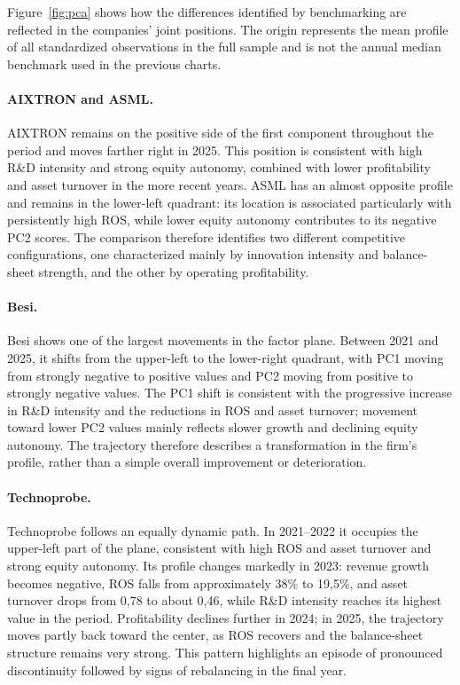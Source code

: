 \documentclass[11pt,a4paper]{article}
\begin{document}
Figure~\ref{fig:pca} shows how the differences identified by benchmarking are reflected in the companies' joint positions. The origin represents the mean profile of all standardized observations in the full sample and is not the annual median benchmark used in the previous charts.

\paragraph{AIXTRON and ASML.}
AIXTRON remains on the positive side of the first component throughout the period and moves farther right in 2025. This position is consistent with high R\&D intensity and strong equity autonomy, combined with lower profitability and asset turnover in the more recent years. ASML has an almost opposite profile and remains in the lower-left quadrant: its location is associated particularly with persistently high ROS, while lower equity autonomy contributes to its negative PC2 scores. The comparison therefore identifies two different competitive configurations, one characterized mainly by innovation intensity and balance-sheet strength, and the other by operating profitability.

\paragraph{Besi.}
Besi shows one of the largest movements in the factor plane. Between 2021 and 2025, it shifts from the upper-left to the lower-right quadrant, with PC1 moving from strongly negative to positive values and PC2 moving from positive to strongly negative values. The PC1 shift is consistent with the progressive increase in R\&D intensity and the reductions in ROS and asset turnover; movement toward lower PC2 values mainly reflects slower growth and declining equity autonomy. The trajectory therefore describes a transformation in the firm's profile, rather than a simple overall improvement or deterioration.

\paragraph{Technoprobe.}
Technoprobe follows an equally dynamic path. In 2021--2022 it occupies the upper-left part of the plane, consistent with high ROS and asset turnover and strong equity autonomy. Its profile changes markedly in 2023: revenue growth becomes negative, ROS falls from approximately 38\% to 19,5\%, and asset turnover drops from 0,78 to about 0,46, while R\&D intensity reaches its highest value in the period. Profitability declines further in 2024; in 2025, the trajectory moves partly back toward the center, as ROS recovers and the balance-sheet structure remains very strong. This pattern highlights an episode of pronounced discontinuity followed by signs of rebalancing in the final year.
\end{document}

